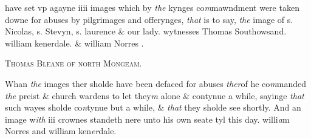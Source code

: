 \documentclass[12pt, a4paper]{book}
\begin{document}
            		
		\ifthenelse{\isodd{\thepage}}
		{\reversemarginpar}
		{\normalmarginpar}
		 have set vp agayne iiii images which by \textit{the} kynges co\textit{m}mawndment were taken downe for abuses by pilgrimages and offerynges, \textit{that} is to say, \textit{the} image of s. Nicolas, s. Stevyn, s.
 laurence \& our lady. wytnesses Thomas Southowsand.
            			william kenerdale. \& william Norres .
 

            
            	
				\begin{center} \begin{large} {\scshape Thomas Bleane of north Mongeam.} \end{large} \end{center}
			

            	
				\marginpar[\vspace{0.5cm}{\textcolor{Gray}{Images}}]{}
			
            		
				\marginpar[\vspace{0.5cm}{\textcolor{Gray}{n+}}]{}
			
            		
		\ifthenelse{\isodd{\thepage}}
		{\reversemarginpar}
		{\normalmarginpar}
		Whan \textit{the} images ther sholde have been defaced for abuses \textit{ther}of
 he co\textit{m}manded \textit{the} preist \& church wardens to let they\textit{m} alone
 \& contynue a while, sayinge \textit{that} such wayes sholde co\textit{n}tynue but
 a while, \& \textit{that} they sholde see shortly. And an image w\textit{ith} iii
 crownes standeth nere unto his own seate tyl this day.
            			willi\textit{a}m Norres and william ken\textit{er}dale.


            
\dotfill
						\newpage {} \subsection*{}  \subsection*{}  \subsection*{}  \subsection*{}  \subsection*{}
\end{document}
